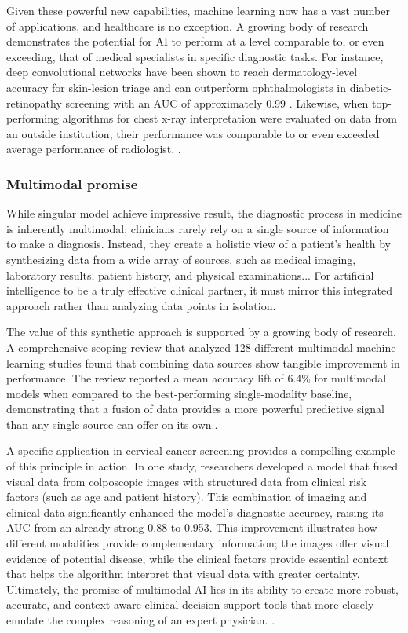 \documentclass[12pt]{report}
\begin{document}
Given these powerful new capabilities, machine learning now has a vast number of applications, and healthcare is no exception. A growing body of research demonstrates the potential for AI to perform at a level comparable to, or even exceeding, that of medical specialists in specific diagnostic tasks. For instance, deep convolutional networks have been shown to reach dermatology-level accuracy for skin-lesion triage \cite{Esteva2017} and can outperform ophthalmologists in diabetic-retinopathy screening with an AUC of approximately \(0.99\) \cite{Gulshan2016}. Likewise, when top-performing algorithms for chest x-ray interpretation were evaluated on data from an outside institution, their performance was comparable to or even exceeded average performance of radiologist. \cite{rajpurkar2020chexpedition}.

\subsubsection{Multimodal promise}
While singular model achieve impressive result, the diagnostic process in medicine is inherently multimodal; clinicians rarely rely on a single source of information to make a diagnosis. Instead, they create a holistic view of a patient’s health by synthesizing data from a wide array of sources, such as medical imaging, laboratory results, patient history, and physical examinations... For artificial intelligence to be a truly effective clinical partner, it must mirror this integrated approach rather than analyzing data points in isolation.

The value of this synthetic approach is supported by a growing body of research. A comprehensive scoping review that analyzed 128 different multimodal machine learning studies found that combining data sources show tangible improvement in performance. The review reported a mean accuracy lift of 6.4\% for multimodal models when compared to the best-performing single-modality baseline, demonstrating that a fusion of data provides a more powerful predictive signal than any single source can offer on its own.\cite{kline2022multimodal}.  

A specific application in cervical-cancer screening provides a compelling example of this principle in action. In one study, researchers developed a model that fused visual data from colposcopic images with structured data from clinical risk factors (such as age and patient history). This combination of imaging and clinical data significantly enhanced the model's diagnostic accuracy, raising its AUC from an already strong 0.88 to 0.953. This improvement illustrates how different modalities provide complementary information; the images offer visual evidence of potential disease, while the clinical factors provide essential context that helps the algorithm interpret that visual data with greater certainty. Ultimately, the promise of multimodal AI lies in its ability to create more robust, accurate, and context-aware clinical decision-support tools that more closely emulate the complex reasoning of an expert physician. \cite{madathil2025multimodal}.  
\end{document}
